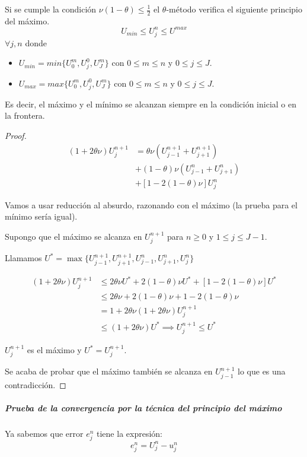 \begin{theorem}
	Si se cumple la condición $\nu(1-\theta)\le\frac{1}{2}$ el $\theta$-método verifica el siguiente principio del máximo.
	$$U_{min} \le U_j^n\le U^{max}$$
	$\forall j,n$ donde 
	\begin{itemize}
		\item $U_{min} = min\{U_0^m, U_j^0, U_J^m\}$ con $0\le m\le n$ y $0 \le j \le J$.
		\item $U_{max} = max\{U_0^m, U_j^0, U_J^m\}$ con $0\le m\le n$ y $0 \le j \le J$.
	\end{itemize}
	Es decir, el máximo y el mínimo se alcanzan siempre en la condición inicial o en la frontera.
\end{theorem}
\begin{proof}
	\begin{align*}
	(1+2\theta\nu)U_j^{n+1} & = \theta\nu(U_{j-1}^{n+1}+U_{j+1}^{n+1})\\
	& + (1-\theta)\nu(U_{j-1}^{n}+U_{j+1}^{n}) \\
	& +	[1-2(1-\theta)\nu]U_{j}^{n}
	\end{align*}
	
	Vamos a usar reducción al absurdo, razonando con el máximo (la prueba para el mínimo sería igual).
	
	Supongo que el máximo se alcanza en $U_j^{n+1}$ para $n\ge 0$ y $1\le j \le J-1$. 
	
	Llamamos $U^\ast = \max\{ U_{j-1}^{n+1},U_{j+1}^{n+1},U_{j-1}^{n},U_{j+1}^{n},U_{j}^{n} \}$
	
	\begin{align*}
	(1+2\theta\nu)U_{j}^{n+1} & \le 2\theta\nu U^\ast + 2(1-\theta)\nu U^\ast + [1-2(1-\theta)\nu]U^\ast\\
	& \le 2\theta\nu + 2(1-\theta) \nu + 1-2(1-\theta)\nu \\
	& = 1+2\theta\nu (1+2\theta\nu)U_{j}^{n+1}\\
	& \le(1+2\theta\nu)U^\ast \implies U_{j}^{n+1} \le U^\ast
	\end{align*}
	
	$U_{j}^{n+1}$ es el máximo y $U^\ast = U_{j}^{n+1}$.
	
	Se acaba de probar que el máximo también se alcanza en $U_{j-1}^{n+1}$ lo que es una contradicción.
\end{proof}

\subparagraph{Prueba de la convergencia por la técnica del principio del máximo}\mbox{}

Ya sabemos que error $e_j^n$ tiene la expresión:
$$e_j^n = U_j^n-u_j^n$$

